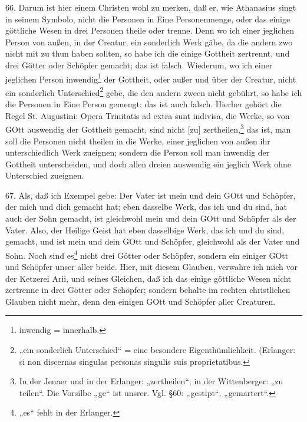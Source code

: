 66. Darum ist hier einem Christen wohl zu merken, daß er, wie Athanasius singt in seinem Symbolo, nicht die Personen in Eine Personenmenge, oder das einige göttliche Wesen in drei Personen theile oder trenne. Denn wo ich einer jeglichen Person von außen, in der Creatur, ein sonderlich Werk gäbe, da die andern zwo nicht mit zu thun haben sollten, so habe ich die einige Gottheit zertrennt, und drei Götter oder Schöpfer gemacht; das ist falsch. Wiederum, wo ich einer jeglichen Person inwendig\footnote{inwendig = innerhalb.} der Gottheit, oder außer und über der Creatur, nicht ein sonderlich Unterschied\footnote{„ein sonderlich Unterschied“ = eine besondere Eigenthümlichkeit. (Erlanger: si non discernas singulas personas singulis suis proprietatibus.} gebe, die den andern zween nicht gebührt, so habe ich die Personen in Eine Person gemengt; das ist auch falsch. Hierher gehört die Regel St. Augustini: Opera Trinitatis ad extra sunt indivisa, die Werke, so von GOtt auswendig der Gottheit gemacht, sind nicht [zu] zertheilen,\footnote{In der Jenaer und in der Erlanger: „zertheilen“; in der Wittenberger: „zu teilen“. Die Vorsilbe „ge“ ist unsrer. Vgl. §60: „gestipt“, „gemartert“.} das ist, man soll die Personen nicht theilen in die Werke, einer jeglichen von außen ihr unterschiedlich Werk zueignen; sondern die Person soll man inwendig der Gottheit unterscheiden, und doch allen dreien auswendig ein jeglich Werk ohne Unterschied zueignen.

67. Als, daß ich Exempel gebe: Der Vater ist mein und dein GOtt und Schöpfer, der mich und dich gemacht hat; eben dasselbe Werk, das ich und du sind, hat auch der Sohn gemacht, ist gleichwohl mein und dein GOtt und Schöpfer als der Vater. Also, der Heilige Geist hat eben dasselbige Werk, das ich und du sind, gemacht, und ist mein und dein GOtt und Schöpfer, gleichwohl als der Vater und Sohn. Noch sind es\footnote{„es“ fehlt in der Erlanger.} nicht drei Götter oder Schöpfer, sondern ein einiger GOtt und Schöpfer unser aller beide. Hier, mit diesem Glauben, verwahre ich mich
vor der Ketzerei Arii, und seines Gleichen, daß ich das einige göttliche Wesen nicht zertrenne in drei Götter oder Schöpfer; sondern behalte im rechten christlichen Glauben nicht mehr, denn den einigen GOtt und Schöpfer aller Creaturen.

